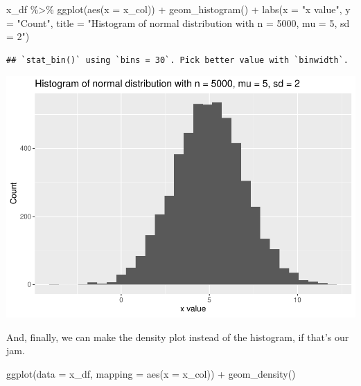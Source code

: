 \documentclass[
]{book}
\newenvironment{Shaded}{\begin{snugshade}}{\end{snugshade}}
\newcommand{\AttributeTok}[1]{\textcolor[rgb]{0.77,0.63,0.00}{#1}}
\newcommand{\FunctionTok}[1]{\textcolor[rgb]{0.00,0.00,0.00}{#1}}
\newcommand{\NormalTok}[1]{#1}
\newcommand{\SpecialCharTok}[1]{\textcolor[rgb]{0.00,0.00,0.00}{#1}}
\newcommand{\StringTok}[1]{\textcolor[rgb]{0.31,0.60,0.02}{#1}}
\begin{document}
\begin{Shaded}
\begin{Highlighting}[]
\NormalTok{x\_df }\SpecialCharTok{\%\textgreater{}\%} 
  \FunctionTok{ggplot}\NormalTok{(}\FunctionTok{aes}\NormalTok{(}\AttributeTok{x =}\NormalTok{ x\_col)) }\SpecialCharTok{+}
  \FunctionTok{geom\_histogram}\NormalTok{() }\SpecialCharTok{+}
  \FunctionTok{labs}\NormalTok{(}\AttributeTok{x =} \StringTok{"x value"}\NormalTok{,}
       \AttributeTok{y =} \StringTok{"Count"}\NormalTok{,}
       \AttributeTok{title =} \StringTok{"Histogram of normal distribution with n = 5000, mu = 5, sd = 2"}\NormalTok{)}
\end{Highlighting}
\end{Shaded}

\begin{verbatim}
## `stat_bin()` using `bins = 30`. Pick better value with `binwidth`.
\end{verbatim}

\includegraphics{test_course_notes_files/figure-latex/unnamed-chunk-29-1.pdf}

And, finally, we can make the density plot instead of the histogram, if that's our jam.

\begin{Shaded}
\begin{Highlighting}[]
\FunctionTok{ggplot}\NormalTok{(}\AttributeTok{data =}\NormalTok{ x\_df, }\AttributeTok{mapping =} \FunctionTok{aes}\NormalTok{(}\AttributeTok{x =}\NormalTok{ x\_col)) }\SpecialCharTok{+}
  \FunctionTok{geom\_density}\NormalTok{()}
\end{Highlighting}
\end{Shaded}
\end{document}
